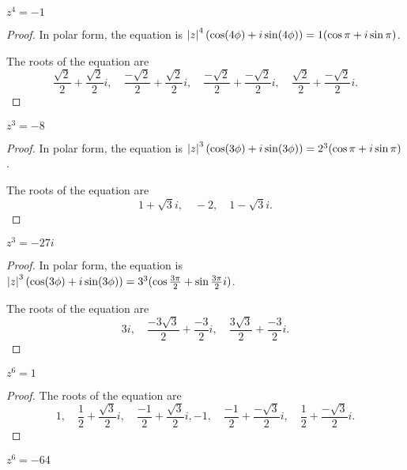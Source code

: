 \begin{exercise}
    $z^{4} = -1$
\end{exercise}

\begin{proof}
    In polar form, the equation is $\left\vert{z}\right\vert^{4}(\cos (4\phi) + i\sin (4\phi)) = 1(\cos\pi + i\sin\pi)$.

    The roots of the equation are
    \[
        \frac{\sqrt{2}}{2} + \frac{\sqrt{2}}{2}i,\quad \frac{-\sqrt{2}}{2} + \frac{\sqrt{2}}{2}i,\quad \frac{-\sqrt{2}}{2} + \frac{-\sqrt{2}}{2}i,\quad \frac{\sqrt{2}}{2} + \frac{-\sqrt{2}}{2}i.
    \]
\end{proof}

\begin{exercise}
    $z^{3} = -8$
\end{exercise}

\begin{proof}
    In polar form, the equation is $\left\vert{z}\right\vert^{3}(\cos (3\phi) + i\sin (3\phi)) = 2^{3}(\cos\pi + i\sin\pi)$.

    The roots of the equation are
    \[
        1 + \sqrt{3}i,\quad -2,\quad 1 - \sqrt{3}i.
    \]
\end{proof}

\begin{exercise}
    $z^{3} = -27i$
\end{exercise}

\begin{proof}
    In polar form, the equation is $\left\vert{z}\right\vert^{3}(\cos (3\phi) + i\sin (3\phi)) = 3^{3}(\cos\frac{3\pi}{2} + \sin\frac{3\pi}{2}i)$.

    The roots of the equation are
    \[
        3i,\quad \frac{-3\sqrt{3}}{2} + \frac{-3}{2}i,\quad\frac{3\sqrt{3}}{2} + \frac{-3}{2}i.
    \]
\end{proof}

\begin{exercise}
    $z^{6} = 1$
\end{exercise}

\begin{proof}
    The roots of the equation are
    \[
        1,\quad \frac{1}{2} + \frac{\sqrt{3}}{2}i,\quad \frac{-1}{2} + \frac{\sqrt{3}}{2}i, -1,\quad \frac{-1}{2} + \frac{-\sqrt{3}}{2}i,\quad \frac{1}{2} + \frac{-\sqrt{3}}{2}i.
    \]
\end{proof}

\begin{exercise}
    $z^{6} = -64$
\end{exercise}

